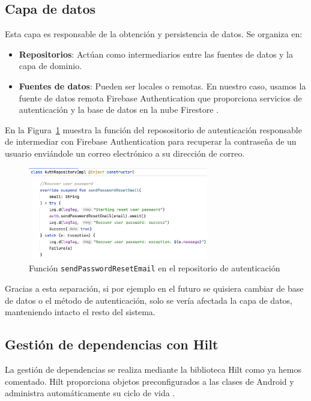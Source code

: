 \subsection{Capa de datos}

Esta capa es responsable de la obtención y persistencia de datos. Se organiza en:

\begin{itemize}
    \item \textbf{Repositorios}: Actúan como intermediarios entre las fuentes de datos y la capa de dominio.
    \item \textbf{Fuentes de datos}: Pueden ser locales o remotas. En nuestro caso, usamos la fuente de datos remota Firebase Authentication que proporciona servicios de autenticación y la base de datos en la nube Firestore \cite{firestore, firebase-auth}.
\end{itemize}

En la Figura~\ref{fig:recoverPassRepo} muestra la función del reposositorio de autenticación responsable de intermediar con Firebase Authentication para recuperar la contraseña de un usuario enviándole un correo electrónico a su dirección de correo.

\begin{figure}[H]
\centering
\includegraphics[width=0.7\textwidth]{./img/description/recoverPassRepo.png}
\caption{Función \texttt{sendPasswordResetEmail} en el repositorio de autenticación}
\label{fig:recoverPassRepo}
\end{figure}

Gracias a esta separación, si por ejemplo en el futuro se quisiera cambiar de base de datos o el método de autenticación, solo se vería afectada la capa de datos, manteniendo intacto el resto del sistema.

\subsection{Gestión de dependencias con Hilt}

La gestión de dependencias se realiza mediante la biblioteca Hilt como ya hemos comentado. Hilt proporciona objetos preconfigurados a las clases de Android y administra automáticamente su ciclo de vida \cite{hilt-android}.

